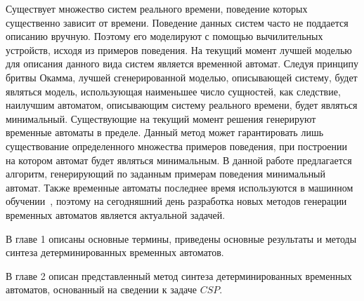\documentclass[times,specification,annotation]{itmo-student-thesis}
\begin{document}





\tableofcontents

\startprefacepage

Существует множество систем реального времени, поведение которых существенно зависит от времени. Поведение данных систем часто не поддается описанию вручную. Поэтому его
моделируют с помощью вычилительных устройств, исходя из примеров поведения. На текущий момент лучшей моделью для описания данного вида систем является временной автомат.
Следуя принципу бритвы Окамма, лучшей сгенерированной моделью, описывающей систему, будет являться модель, использующая наименьшее число сущностей, как следствие,
наилучшим автоматом, описывающим систему реального времени, будет являться минимальный. Существующие на текущий момент решения генерируют временные
автоматы в пределе. Данный метод может гарантировать лишь существование определенного множества примеров поведения, при построении на котором автомат будет являться минимальным.
В данной работе предлагается алгоритм, генерирующий по заданным примерам поведения минимальный автомат. Также временные автоматы последнее время используются в машинном обучении~\cite{moha}, 
поэтому на сегодняшний день разработка новых методов генерации временных автоматов является актуальной задачей. 

В главе 1 описаны основные термины, приведены основные результаты и методы синтеза детерминированных временных автоматов.

В главе 2 описан представленный метод синтеза детерминированных временных автоматов, основанный на сведении к задаче $CSP$.
\end{document}
